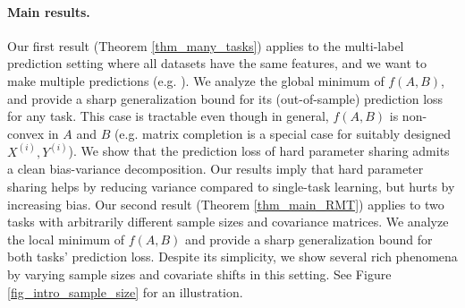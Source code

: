 


\paragraph{Main results.}
Our first result (Theorem \ref{thm_many_tasks}) applies to the multi-label prediction setting where all datasets have the same features, and we want to make multiple predictions (e.g. \cite{hsu2009multi}).
We analyze the global minimum of $f(A, B)$, and provide a sharp generalization bound for its (out-of-sample) prediction loss for any task.
This case is tractable even though in general, $f(A, B)$ is non-convex in $A$ and $B$ (e.g. matrix completion is a special case for suitably designed $X^{(i)}, Y^{(i)}$).
We show that the prediction loss of hard parameter sharing admits a clean bias-variance decomposition.
Our results imply that hard parameter sharing helps by reducing variance compared to single-task learning, but hurts by increasing bias.
Our second result (Theorem \ref{thm_main_RMT}) applies to two tasks with arbitrarily different sample sizes and covariance matrices.
We analyze the local minimum of $f(A, B)$ and provide a sharp generalization bound for both tasks' prediction loss.
Despite its simplicity, we show several rich phenomena by varying sample sizes and covariate shifts in this setting.
See Figure \ref{fig_intro_sample_size} for an illustration.

